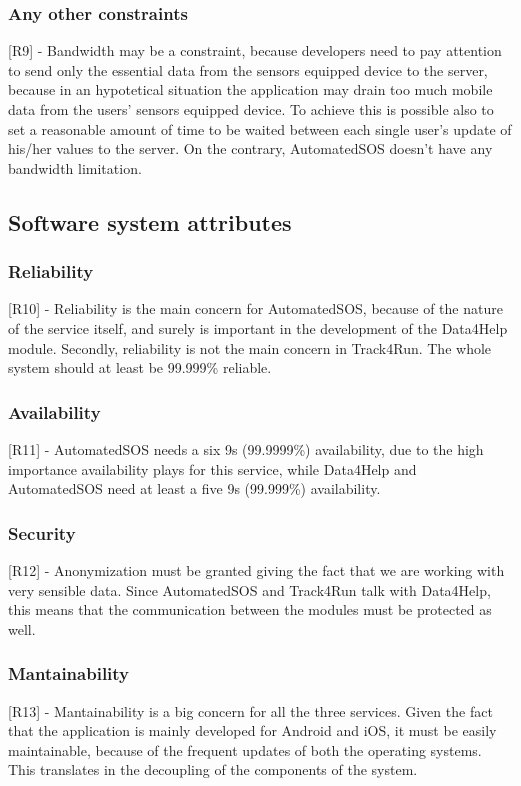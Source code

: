 {\color{secblue}\subsubsection{Any other constraints}}
[R9] - Bandwidth may be a constraint, because developers need to pay attention to send only the essential data from the sensors equipped device to the server, because in an hypotetical situation the application may drain too much mobile data from the users' sensors equipped device. To achieve this is possible also to set a reasonable amount of time to be waited between each single user's update of his/her values to the server. On the contrary, AutomatedSOS doesn't have any bandwidth limitation.
{\color{secblue}\subsection{Software system attributes}}
{\color{secblue}\subsubsection{Reliability}}
[R10] - Reliability is the main concern for AutomatedSOS, because of the nature of the service itself, and surely is important in the development of the Data4Help module. Secondly, reliability is not the main concern in Track4Run.
The whole system should at least be 99.999\% reliable.
{\color{secblue}\subsubsection{Availability}}
[R11] - AutomatedSOS needs a six 9s (99.9999\%) availability, due to the high importance availability plays for this service, while Data4Help and AutomatedSOS need at least a five 9s (99.999\%) availability.
{\color{secblue}\subsubsection{Security}}
[R12] - Anonymization must be granted giving the fact that we are working with very sensible data.
Since AutomatedSOS and Track4Run talk with Data4Help, this means that the communication between the modules must be protected as well. 

{\color{secblue}\subsubsection{Mantainability}}
[R13] - Mantainability is a big concern for all the three services. Given the fact that the application is mainly developed for Android and iOS, it must be easily maintainable, because of the frequent updates of both the operating systems. This translates in the decoupling of the components of the system.

